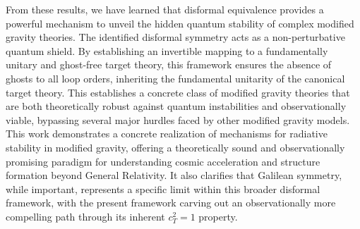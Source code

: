 \documentclass[twocolumn]{aastex631}
\begin{document}
From these results, we have learned that disformal equivalence provides a powerful mechanism to unveil the hidden quantum stability of complex modified gravity theories. The identified disformal symmetry acts as a non-perturbative quantum shield. By establishing an invertible mapping to a fundamentally unitary and ghost-free target theory, this framework ensures the absence of ghosts to all loop orders, inheriting the fundamental unitarity of the canonical target theory. This establishes a concrete class of modified gravity theories that are both theoretically robust against quantum instabilities and observationally viable, bypassing several major hurdles faced by other modified gravity models. This work demonstrates a concrete realization of mechanisms for radiative stability in modified gravity, offering a theoretically sound and observationally promising paradigm for understanding cosmic acceleration and structure formation beyond General Relativity. It also clarifies that Galilean symmetry, while important, represents a specific limit within this broader disformal framework, with the present framework carving out an observationally more compelling path through its inherent $c_T^2=1$ property.
\end{document}
